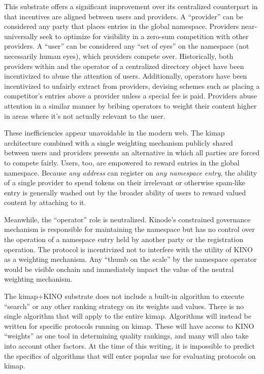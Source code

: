 \documentclass[runningheads]{llncs}
\begin{document}
This substrate offers a significant improvement over its centralized counterpart in that incentives are aligned between users and providers.
A ``provider'' can be considered any party that places entries in the global namespace.
Providers near-universally seek to optimize for visibility in a zero-sum competition with other providers.
A ``user'' can be considered any ``set of eyes'' on the namespace (not necessarily human eyes), which providers compete over.
Historically, both providers within and the operator of a centralized directory object have been incentivized to abuse the attention of users.
Additionally, operators have been incentivized to unfairly extract from providers, devising schemes such as placing a competitor's entries above a provider unless a special fee is paid.
Providers abuse attention in a similar manner by bribing operators to weight their content higher in areas where it's not actually relevant to the user.

These inefficiencies appear unavoidable in the modern web.
The kimap architecture combined with a single weighting mechanism publicly shared between users and providers presents an alternative in which all parties are forced to compete fairly.
Users, too, are empowered to reward entries in the global namespace.
Because \textit{any address} can register on \textit{any namespace entry}, the ability of a single provider to spend tokens on their irrelevant or otherwise spam-like entry is generally washed out by the broader ability of users to reward valued content by attaching to it.

Meanwhile, the ``operator'' role is neutralized.
Kinode's constrained governance mechanism is responsible for maintaining the namespace but has no control over the operation of a namespace entry held by another party or the registration operation.
The protocol is incentivized not to interfere with the utility of KINO as a weighting mechanism.
Any ``thumb on the scale'' by the namespace operator would be visible onchain and immediately impact the value of the neutral weighting mechanism.

The kimap+KINO substrate does not include a built-in algorithm to execute ``search'' or any other ranking strategy on its weights and values.
There is no single algorithm that will apply to the entire kimap.
Algorithms will instead be written for specific protocols running on kimap.
These will have access to KINO ``weights'' as one tool in determining quality rankings, and many will also take into account other factors.
At the time of this writing, it is impossible to predict the specifics of algorithms that will enter popular use for evaluating protocols on kimap.
\end{document}
